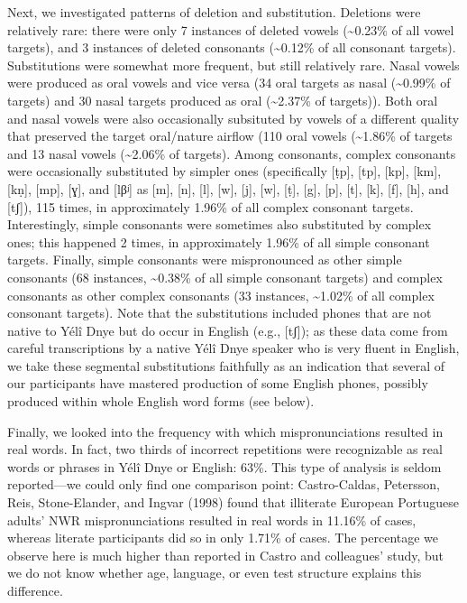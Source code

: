 \documentclass[english,,man,floatsintext]{apa6}
\begin{document}
Next, we investigated patterns of deletion and substitution. Deletions were relatively rare: there were only 7 instances of deleted vowels (\textasciitilde{}0.23\% of all vowel targets), and 3 instances of deleted consonants (\textasciitilde{}0.12\% of all consonant targets). Substitutions were somewhat more frequent, but still relatively rare. Nasal vowels were produced as oral vowels and vice versa (34 oral targets as nasal (\textasciitilde{}0.99\% of targets) and 30 nasal targets produced as oral (\textasciitilde{}2.37\% of targets)). Both oral and nasal vowels were also occasionally subsituted by vowels of a different quality that preserved the target oral/nature airflow (110 oral vowels (\textasciitilde{}1.86\% of targets and 13 nasal vowels (\textasciitilde{}2.06\% of targets). Among consonants, complex consonants were occasionally substituted by simpler ones (specifically {[}ṭp{]}, {[}tp{]}, {[}kp{]}, {[}km{]}, {[}kṇ{]}, {[}mp{]}, {[}ɣ{]}, and {[}lβʲ{]} as {[}m{]}, {[}n{]}, {[}l{]}, {[}w{]}, {[}j{]}, {[}w{]}, {[}ṭ{]}, {[}g{]}, {[}p{]}, {[}t{]}, {[}k{]}, {[}f{]}, {[}h{]}, and {[}tʃ{]}), 115 times, in approximately 1.96\% of all complex consonant targets. Interestingly, simple consonants were sometimes also substituted by complex ones; this happened 2 times, in approximately 1.96\% of all simple consonant targets. Finally, simple consonants were mispronounced as other simple consonants (68 instances, \textasciitilde{}0.38\% of all simple consonant targets) and complex consonants as other complex consonants (33 instances, \textasciitilde{}1.02\% of all complex consonant targets). Note that the substitutions included phones that are not native to Yélî Dnye but do occur in English (e.g., {[}tʃ{]}); as these data come from careful transcriptions by a native Yélî Dnye speaker who is very fluent in English, we take these segmental substitutions faithfully as an indication that several of our participants have mastered production of some English phones, possibly produced within whole English word forms (see below).

Finally, we looked into the frequency with which mispronunciations resulted in real words. In fact, two thirds of incorrect repetitions were recognizable as real words or phrases in Yélî Dnye or English: 63\%. This type of analysis is seldom reported---we could only find one comparison point: Castro-Caldas, Petersson, Reis, Stone-Elander, and Ingvar (1998) found that illiterate European Portuguese adults' NWR mispronunciations resulted in real words in 11.16\% of cases, whereas literate participants did so in only 1.71\% of cases. The percentage we observe here is much higher than reported in Castro and colleagues' study, but we do not know whether age, language, or even test structure explains this difference.
\end{document}
